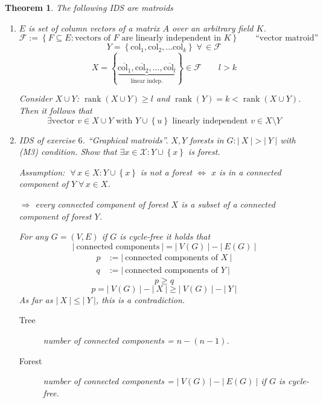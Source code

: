 \documentclass{article}
\newtheorem{theorem}{Theorem}
\newcommand{\card}[1]{\left|\:\!#1\:\!\right|}
\newcommand{\set}[1]{\left\{#1\right\}}
\newcommand{\fall}{\;\forall\,}
\DeclareMathOperator{\rank}{rank}
\begin{document}
\begin{theorem}
  \label{proposition-8.1}
  The following IDS are matroids
  \begin{enumerate}
    \item $E$ is set of column vectors of a matrix $A$ over an arbitrary field $K$.
      \[
        \mathcal{F} := \set{F \subseteq E: \text{vectors of } F \text{ are linearly independent in } K}
            \qquad \text{``vector matroid''}
      \] \[
        Y = \set{\text{col}_1, \text{col}_2, \ldots \text{col}_k} \fall \in \mathcal{F}
      \] \[
        X = \set{
          \underbrace{\overline{\text{col}_1}, \overline{\text{col}_2}, \ldots, \overline{\text{col}_l}}_{\text{linear indep.}}
        } \in \mathcal{F} \qquad l > k
      \]

      Consider $X \cup Y$: $\rank(X \cup Y) \geq l$ and $\rank(Y) = k < \rank(X \cup Y)$.
      Then it follows that
      \[
        \exists \text{vector } v \in X \cup Y \text{ with } Y \cup \set{u}
        \text{ linearly independent } v \in X \setminus Y
      \]

    \item IDS of exercise $6$. ``\emph{Graphical matroids}''. 
      $X, Y$ forests in $G: \card{X} > \card{Y}$ with (M3) condition. Show that $\exists x \in \mathcal{X}: Y \cup \set{x}$ is forest.

      Assumption: $\fall x \in X: Y \cup \set{x}$ is not a forest $\Leftrightarrow$ $x$ is in a connected component of $Y \fall x \in X$.

      $\Rightarrow$ every connected component of forest $X$ is a subset of a connected component of forest $Y$.


      For any $G = (V, E)$ if $G$ is cycle-free it holds that
      \[ \card{\text{connected components}} = \card{V(G)} - \card{E(G)}  \]
      \begin{align*}
        p &:= \card{\text{connected components of } X} \\
        q &:= \card{\text{connected components of } Y}
      \end{align*}
      \[
        p \geq q
      \] \[
        p = \card{V(G)} - \card{X} \geq \card{V(G)} - \card{Y}
      \]
      As far as $\card{X} \leq \card{Y}$, this is a contradiction.

      \begin{framed}
        \begin{description}
          \item[Tree] number of connected components = $n - (n-1)$. \\
          \item[Forest] number of connected components = $\card{V(G)} - \card{E(G)}$ if $G$ is cycle-free.
        \end{description}
      \end{framed}


\end{enumerate}
\end{theorem}
\end{document}
